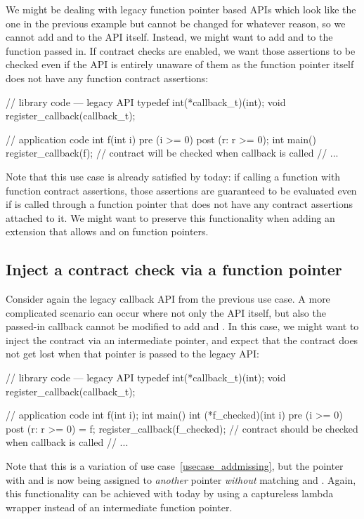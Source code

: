 We might be dealing with legacy function pointer based APIs which look like the one in the previous example but cannot be changed for whatever reason, so we cannot add  and  to the API itself. Instead, we might want to add  and  to the function passed in. If contract checks are enabled, we want those assertions to be checked even if the API is entirely unaware of them as the function pointer itself does not have any function contract assertions:
\begin{codeblock}
// library code --- legacy API
typedef int(*callback_t)(int);
void register_callback(callback_t);

// application code
int f(int i) pre (i >= 0) post (r: r >= 0); 
int main() {
  register_callback(f);  // contract will be checked when callback is called
  // ...
}
\end{codeblock}
Note that this use case is already satisfied by \cite{P2900R9} today: if calling a function  with function contract assertions, those assertions are guaranteed to be evaluated even if  is called through a function pointer that does not have any contract assertions attached to it. We might want to preserve this functionality when adding an extension that allows  and  on function pointers.


\subsection{Inject a contract check via a function pointer}
\label{usecase_inject}
Consider again the legacy callback API from the previous use case. A more complicated scenario can occur where not only the API itself, but also the passed-in callback  cannot be modified to add  and . In this case, we might want to inject the contract via an intermediate pointer, and expect that the contract does not get lost when that pointer is passed to the legacy API:
\begin{codeblock}
// library code --- legacy API
typedef int(*callback_t)(int);
void register_callback(callback_t);

// application code
int f(int i); 
int main() {
  int (*f_checked)(int i) pre (i >= 0) post (r: r >= 0) = f;
  register_callback(f_checked);  // contract should be checked when callback is called
  // ...
}
\end{codeblock}
Note that this is a variation of use case~\ref{usecase_addmissing}, but the pointer with  and  is now being assigned to \emph{another} pointer \emph{without} matching  and . Again, this functionality can be achieved with \cite{P2900R9} today by using a captureless lambda wrapper instead of an intermediate function pointer.

